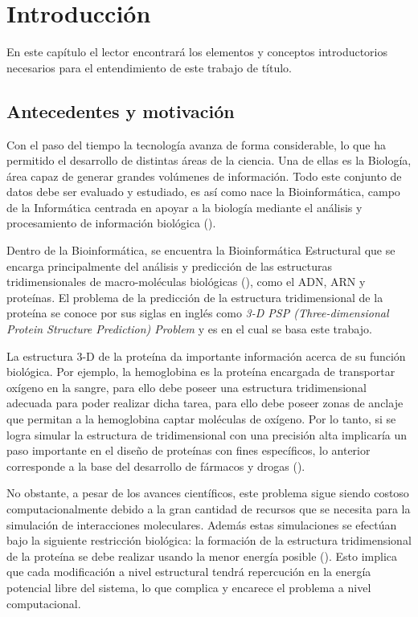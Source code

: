 \chapter{Introducci\'on}
\label{cap:intro}
En este capítulo el lector encontrará los elementos y conceptos introductorios necesarios para el entendimiento de este trabajo de título. 

\section{Antecedentes y motivaci\'on}
\label{intro:motivacion}

Con el paso del tiempo la tecnología avanza de forma considerable, lo que ha permitido el desarrollo de distintas áreas de la ciencia. Una de ellas es la Biología, área capaz de generar grandes volúmenes de información. Todo este conjunto de datos debe ser evaluado y estudiado, es así como nace la Bioinformática, campo de la Informática centrada en apoyar a la biología mediante el análisis y procesamiento de información biológica (\citealp{bioinf:def}).

Dentro de la Bioinformática, se encuentra la Bioinformática Estructural que se encarga principalmente del análisis y predicción de las estructuras tridimensionales de macro-moléculas biológicas (\citealp{bioinf:struct}), como el ADN, ARN y proteínas. El problema de la predicción de la estructura tridimensional de la proteína se conoce por sus siglas en inglés como \textit{3-D PSP (Three-dimensional Protein Structure Prediction) Problem} y es en el cual se basa este trabajo.

La estructura 3-D de la proteína da importante información acerca de su función biológica. Por ejemplo, la hemoglobina es la proteína encargada de transportar oxígeno en la sangre, para ello debe poseer una estructura tridimensional adecuada para poder realizar dicha tarea, para ello debe poseer zonas de anclaje que permitan a la hemoglobina captar moléculas de oxígeno. Por lo tanto, si se logra simular la estructura de tridimensional con una precisión alta implicaría un paso importante en el diseño de proteínas con fines específicos, lo anterior corresponde a la base del desarrollo de fármacos y drogas (\citealp{Cohen19961}).

No obstante, a pesar de los avances científicos, este problema sigue siendo costoso computacionalmente debido a la gran cantidad de recursos que se necesita para la simulación de interacciones moleculares. Además estas simulaciones se efectúan bajo la siguiente restricción biológica: la formación de la estructura tridimensional de la proteína se debe realizar usando la menor energía posible (\citealp{Anfinsen:1972}). Esto implica que cada modificación a nivel estructural tendrá repercución en la energía potencial libre del sistema, lo que complica y encarece el problema a nivel computacional.


